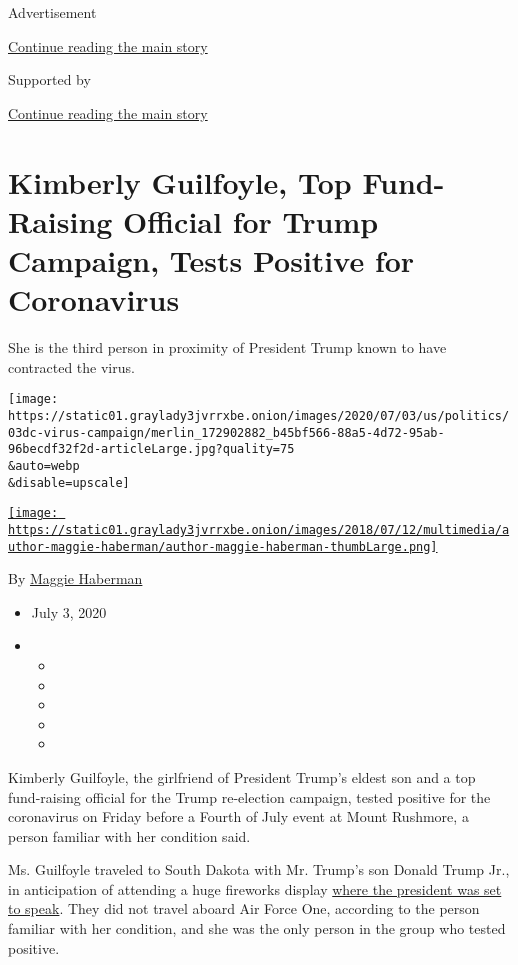 Advertisement

\protect\hyperlink{after-top}{Continue reading the main story}

Supported by

\protect\hyperlink{after-sponsor}{Continue reading the main story}

\hypertarget{kimberly-guilfoyle-top-fund-raising-official-for-trump-campaign-tests-positive-for-coronavirus}{%
\section{Kimberly Guilfoyle, Top Fund-Raising Official for Trump
Campaign, Tests Positive for
Coronavirus}\label{kimberly-guilfoyle-top-fund-raising-official-for-trump-campaign-tests-positive-for-coronavirus}}

She is the third person in proximity of President Trump known to have
contracted the virus.

\texttt{[image: https://static01.graylady3jvrrxbe.onion/images/2020/07/03/us/politics/03dc-virus-campaign/merlin\_172902882\_b45bf566-88a5-4d72-95ab-96becdf32f2d-articleLarge.jpg?quality=75\\\&auto=webp\\\&disable=upscale]}

\href{https://www.nytimes3xbfgragh.onion/by/maggie-haberman}{\texttt{[image: https://static01.graylady3jvrrxbe.onion/images/2018/07/12/multimedia/author-maggie-haberman/author-maggie-haberman-thumbLarge.png]}}

By \href{https://www.nytimes3xbfgragh.onion/by/maggie-haberman}{Maggie
Haberman}

\begin{itemize}
\item
  July 3, 2020
\item
  \begin{itemize}
  \item
  \item
  \item
  \item
  \item
  \end{itemize}
\end{itemize}

Kimberly Guilfoyle, the girlfriend of President Trump's eldest son and a
top fund-raising official for the Trump re-election campaign, tested
positive for the coronavirus on Friday before a Fourth of July event at
Mount Rushmore, a person familiar with her condition said.

Ms. Guilfoyle traveled to South Dakota with Mr. Trump's son Donald Trump
Jr., in anticipation of attending a huge fireworks display
\href{https://www.nytimes3xbfgragh.onion/2020/07/03/us/politics/trump-coronavirus-mount-rushmore.html}{where
the president was set to speak}. They did not travel aboard Air Force
One, according to the person familiar with her condition, and she was
the only person in the group who tested positive.

